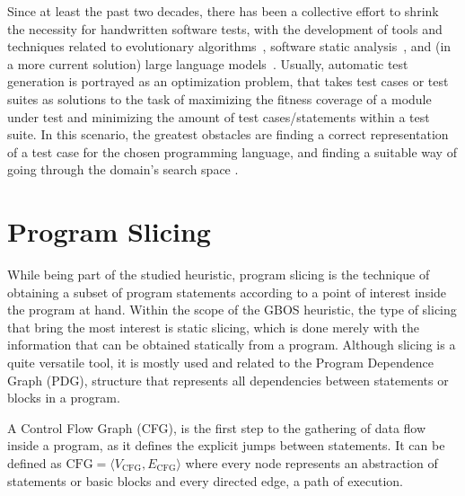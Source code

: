 \documentclass[%
  chapterprefix=false,%
  open=right,%
  twoside=true,%
  paper=a4,%
  logofile={Figures/logo.png},%
  thesistype=master,%
  UKenglish,%
]{se2thesis}
\begin{document}
Since at least the past two decades, there has been a collective effort to shrink the necessity for handwritten software tests, with the development of tools and techniques related to evolutionary algorithms~\cite{DBLP:conf/sigsoft/FraserA11}, software static analysis~\cite{DBLP:conf/osdi/CadarDE08}, and (in a more current solution) large language models~\cite{DBLP:journals/corr/abs-2207-10397}.
Usually, automatic test generation is portrayed as an optimization problem, that takes test cases or test suites as solutions to the task of maximizing the fitness coverage of a module under test and minimizing the amount of test cases/statements within a test suite.
In this scenario, the greatest obstacles are finding a correct representation of a test case for the chosen programming language, and finding a suitable way of going through the domain's search space .

\newpage

\section{Program Slicing}\label{sec:slicing}

While being part of the studied heuristic, program slicing is the technique of obtaining a subset of program statements according to a point of interest inside the program at hand.
Within the scope of the GBOS heuristic, the type of slicing that bring the most interest is static slicing, which is done merely with the information that can be obtained statically from a program.
Although slicing is a quite versatile tool, it is mostly used and related to the Program Dependence Graph (PDG), structure that represents all dependencies between statements or blocks in a program.

A Control Flow Graph (CFG), is the first step to the gathering of data flow inside a program, as it defines the explicit jumps between statements.
It can be defined as \(\text{CFG} = \langle V_{\text{CFG}}, E_{\text{CFG}} \rangle\) where every node represents an abstraction of statements or basic blocks and every directed edge, a path of execution.
\end{document}

